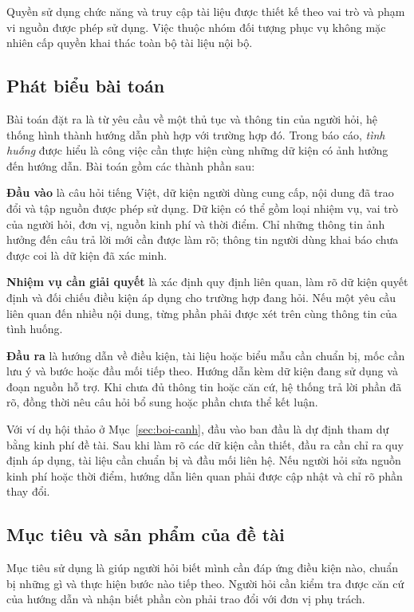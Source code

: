 Quyền sử dụng chức năng và truy cập tài liệu được thiết kế theo vai trò
và phạm vi nguồn được phép sử dụng. Việc thuộc nhóm đối tượng phục vụ
không mặc nhiên cấp quyền khai thác toàn bộ tài liệu nội bộ.

\subsection{Phát biểu bài toán}
Bài toán đặt ra là từ yêu cầu về một thủ tục và thông tin của người hỏi,
hệ thống hình thành hướng dẫn phù hợp với trường hợp đó. Trong báo cáo,
\emph{tình huống} được hiểu là công việc cần thực hiện cùng những dữ kiện
có ảnh hưởng đến hướng dẫn. Bài toán gồm các thành phần sau:

\textbf{Đầu vào} là câu hỏi tiếng Việt, dữ kiện người dùng cung cấp, nội
dung đã trao đổi và tập nguồn được phép sử dụng. Dữ kiện có thể gồm loại
nhiệm vụ, vai trò của người hỏi, đơn vị, nguồn kinh phí và thời điểm. Chỉ
những thông tin ảnh hưởng đến câu trả lời mới cần được làm rõ; thông tin
người dùng khai báo chưa được coi là dữ kiện đã xác minh.

\textbf{Nhiệm vụ cần giải quyết} là xác định quy định liên quan, làm rõ
dữ kiện quyết định và đối chiếu điều kiện áp dụng cho trường hợp đang hỏi.
Nếu một yêu cầu liên quan đến nhiều nội dung, từng phần phải được xét trên
cùng thông tin của tình huống.

\textbf{Đầu ra} là hướng dẫn về điều kiện, tài liệu hoặc biểu mẫu cần
chuẩn bị, mốc cần lưu ý và bước hoặc đầu mối tiếp theo. Hướng dẫn kèm dữ
kiện đang sử dụng và đoạn nguồn hỗ trợ. Khi chưa đủ thông tin hoặc căn cứ,
hệ thống trả lời phần đã rõ, đồng thời nêu câu hỏi bổ sung hoặc phần chưa
thể kết luận.

Với ví dụ hội thảo ở Mục~\ref{sec:boi-canh}, đầu vào ban đầu là dự định
tham dự bằng kinh phí đề tài. Sau khi làm rõ các dữ kiện cần thiết, đầu ra
cần chỉ ra quy định áp dụng, tài liệu cần chuẩn bị và đầu mối liên hệ.
Nếu người hỏi sửa nguồn kinh phí hoặc thời điểm, hướng dẫn liên quan phải
được cập nhật và chỉ rõ phần thay đổi.

\subsection{Mục tiêu và sản phẩm của đề tài}
Mục tiêu sử dụng là giúp người hỏi biết mình cần đáp ứng điều kiện nào,
chuẩn bị những gì và thực hiện bước nào tiếp theo. Người hỏi cần kiểm tra
được căn cứ của hướng dẫn và nhận biết phần còn phải trao đổi với đơn vị
phụ trách.


